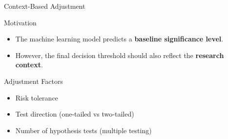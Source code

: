 \begin{frame}{Context-Based Adjustment}
	
	\begin{block}{Motivation}
		
		\begin{itemize}
			\item The machine learning model predicts a \textbf{baseline significance level}.
			\item However, the final decision threshold should also reflect the \textbf{research context}.
		\end{itemize}
		
	\end{block}
	
	\vspace{0.4cm}
	
	\begin{exampleblock}{Adjustment Factors}
		
		\begin{itemize}
			\item Risk tolerance
			\item Test direction (one-tailed vs two-tailed)
			\item Number of hypothesis tests (multiple testing)
		\end{itemize}
		
	\end{exampleblock}
	
\end{frame}
